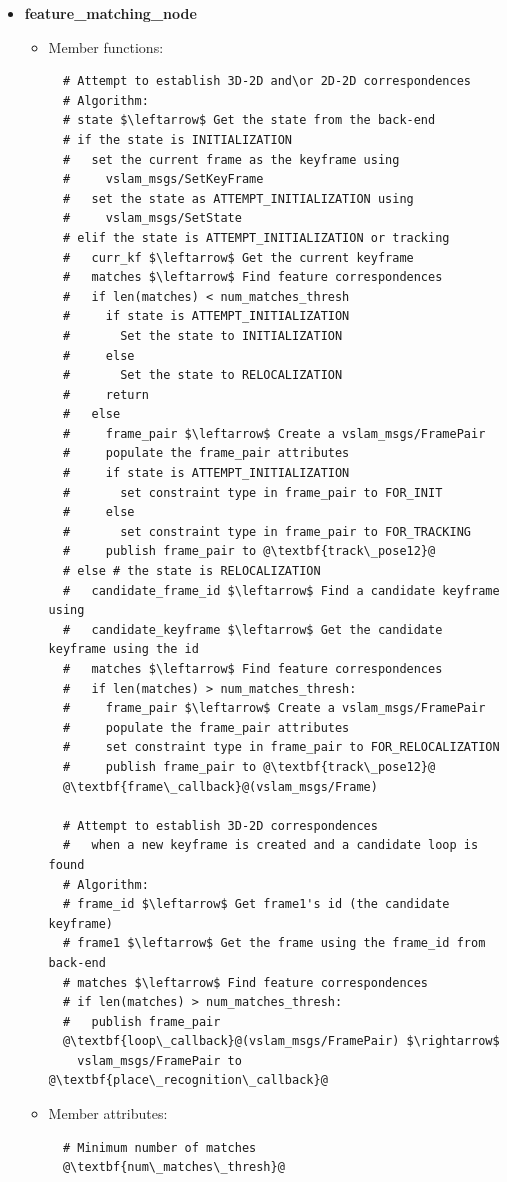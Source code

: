 \begin{itemize}
  \item \textbf{feature\_matching\_node}
  \begin{itemize}
    \item Member functions:
\begin{lstlisting}
  # Attempt to establish 3D-2D and\or 2D-2D correspondences
  # Algorithm:
  # state $\leftarrow$ Get the state from the back-end
  # if the state is INITIALIZATION
  #   set the current frame as the keyframe using 
  #     vslam_msgs/SetKeyFrame
  #   set the state as ATTEMPT_INITIALIZATION using 
  #     vslam_msgs/SetState
  # elif the state is ATTEMPT_INITIALIZATION or tracking
  #   curr_kf $\leftarrow$ Get the current keyframe
  #   matches $\leftarrow$ Find feature correspondences 
  #   if len(matches) < num_matches_thresh
  #     if state is ATTEMPT_INITIALIZATION
  #       Set the state to INITIALIZATION
  #     else
  #       Set the state to RELOCALIZATION
  #     return
  #   else
  #     frame_pair $\leftarrow$ Create a vslam_msgs/FramePair 
  #     populate the frame_pair attributes 
  #     if state is ATTEMPT_INITIALIZATION
  #       set constraint type in frame_pair to FOR_INIT
  #     else
  #       set constraint type in frame_pair to FOR_TRACKING
  #     publish frame_pair to @\textbf{track\_pose12}@
  # else # the state is RELOCALIZATION
  #   candidate_frame_id $\leftarrow$ Find a candidate keyframe using
  #   candidate_keyframe $\leftarrow$ Get the candidate keyframe using the id
  #   matches $\leftarrow$ Find feature correspondences
  #   if len(matches) > num_matches_thresh:
  #     frame_pair $\leftarrow$ Create a vslam_msgs/FramePair 
  #     populate the frame_pair attributes 
  #     set constraint type in frame_pair to FOR_RELOCALIZATION
  #     publish frame_pair to @\textbf{track\_pose12}@
  @\textbf{frame\_callback}@(vslam_msgs/Frame) 

  # Attempt to establish 3D-2D correspondences
  #   when a new keyframe is created and a candidate loop is found
  # Algorithm:
  # frame_id $\leftarrow$ Get frame1's id (the candidate keyframe)
  # frame1 $\leftarrow$ Get the frame using the frame_id from back-end
  # matches $\leftarrow$ Find feature correspondences
  # if len(matches) > num_matches_thresh:
  #   publish frame_pair
  @\textbf{loop\_callback}@(vslam_msgs/FramePair) $\rightarrow$ 
    vslam_msgs/FramePair to @\textbf{place\_recognition\_callback}@

\end{lstlisting}

    \item Member attributes:
\begin{lstlisting}
  # Minimum number of matches
  @\textbf{num\_matches\_thresh}@
\end{lstlisting}
  \end{itemize}  


\end{itemize}
